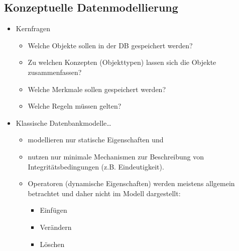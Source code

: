         \subsection{Konzeptuelle Datenmodellierung} %
            \begin{itemize}
            	\item Kernfragen
            		\begin{itemize}
            			\item Welche Objekte sollen in der DB gespeichert werden?
            			\item Zu welchen Konzepten (Objekttypen) lassen sich die Objekte zusammenfassen?
            			\item Welche Merkmale sollen gespeichert werden?
            			\item Welche Regeln müssen gelten?
            		\end{itemize}
            	\item Klassische Datenbankmodelle\dots
            		\begin{itemize}
            			\item modellieren nur statische Eigenschaften und
            			\item nutzen nur minimale Mechanismen zur Beschreibung von Integritätsbedingungen (z.B. Eindeutigkeit).
            			\item Operatoren (dynamische Eigenschaften) werden meistens allgemein betrachtet und daher nicht im Modell dargestellt:
            				\begin{itemize}
            					\item Einfügen
            					\item Verändern
            					\item Löschen
            				\end{itemize}
            		\end{itemize}
            \end{itemize}


